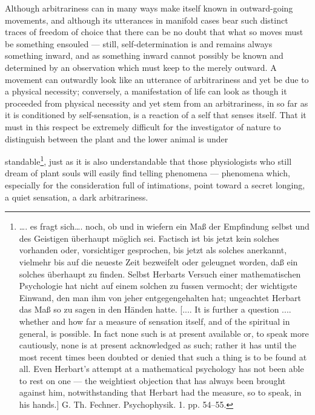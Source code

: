 \documentclass[12pt,a4paper]{book}
\begin{document}
Although arbitrariness can in many ways make itself known in outward-going
movements, and although its utterances in manifold cases bear such distinct traces
of freedom of choice that there can be no doubt that what so moves must be
something ensouled --- still, self-determination is and remains always something
inward, and as something inward cannot possibly be known and determined by an
observation which must keep to the merely outward. A movement can outwardly look
like an utterance of arbitrariness and yet be due to a physical necessity;
conversely, a manifestation of life can look as though it proceeded from physical
necessity and yet stem from an arbitrariness, in so far as it is conditioned by
self-sensation, is a reaction of a self that senses itself. That it must in this
respect be extremely difficult for the investigator of nature to distinguish
between the plant and the lower animal is under%

\setcounter{footnote}{0}%
standable\footnote{\ldots. es fragt sich\ldots. noch, ob und in wiefern ein Maß
der Empfindung selbst und des Geistigen überhaupt möglich sei. Factisch ist bis
jetzt kein solches vorhanden oder, vorsichtiger gesprochen, bis jetzt als solches
anerkannt, vielmehr bis auf die neueste Zeit bezweifelt oder geleugnet worden, daß
ein solches überhaupt zu finden. Selbst Herbarts Versuch einer mathematischen
Psychologie hat nicht auf einem solchen zu fussen vermocht; der wichtigste
Einwand, den man ihm von jeher entgegengehalten hat; ungeachtet Herbart das Maß so
zu sagen in den Händen hatte. [.... It is further a question .... whether and how
far a measure of sensation itself, and of the spiritual in general, is possible.
In fact none such is at present available or, to speak more cautiously, none is at
present acknowledged as such; rather it has until the most recent times been
doubted or denied that such a thing is to be found at all. Even Herbart's attempt
at a mathematical psychology has not been able to rest on one --- the weightiest
objection that has always been brought against him, notwithstanding that Herbart
had the measure, so to speak, in his hands.] G. Th. Fechner. Psychophysik. 1.
pp. 54--55.},
just as it is also understandable that those physiologists who still dream of plant
souls will easily find telling phenomena --- phenomena which, especially for the
consideration full of intimations, point toward a secret longing, a quiet
sensation, a dark arbitrariness.
\end{document}
